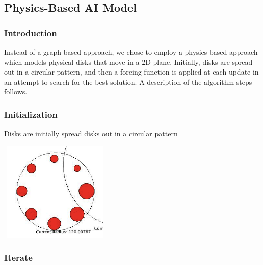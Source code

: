 \documentclass[a4paper]{article}
\begin{document}
\subsection*{Physics-Based AI Model}

\subsubsection*{Introduction}

Instead of a graph-based approach, we chose to employ a physics-based approach which models physical disks that move in a 2D plane.  Initially, disks are spread out in a circular pattern, and then a forcing function is applied at each update in an attempt to search for the best solution.  A description of the algorithm steps follows.  

\subsubsection*{Initialization}
Disks are initially spread disks out in a circular pattern

\includegraphics[width=200px,height=180px]{main/data/physics_init_clipped.png}

\subsubsection*{Iterate}
\end{document}
